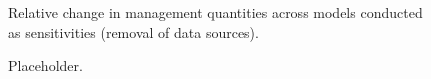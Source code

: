 \documentclass[
]{scrartcl}
\begin{document}
\begin{figure}[H]


\caption{\label{fig-sens_sum_data}Relative change in management
quantities across models conducted as sensitivities (removal of data
sources).}

\end{figure}%

\newpage

\newpage

\newpage

\begin{figure}[H]


\caption{\label{fig-management-depletion}Placeholder.}

\end{figure}%
\end{document}
